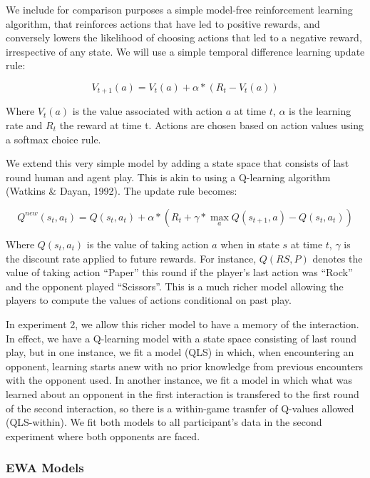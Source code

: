 \documentclass[man,floatsintext]{apa6}
\begin{document}
We include for comparison purposes a simple model-free reinforcement learning algorithm, that reinforces actions that have led to positive rewards, and conversely lowers the likelihood of choosing actions that led to a negative reward, irrespective of any state. We will use a simple temporal difference learning update rule:

\[ V_{t+1}(a) = V_{t}(a) + \alpha*( R_{t}  - V_{t}(a)) \]

Where \(V_{t}(a)\) is the value associated with action \(a\) at time \(t\), \(\alpha\) is the learning rate and \(R_{t}\) the reward at time t. Actions are chosen based on action values using a softmax choice rule.

We extend this very simple model by adding a state space that consists of last round human and agent play. This is akin to using a Q-learning algorithm (Watkins \& Dayan, 1992). The update rule becomes:

\[ Q^{new}(s_{t},a_{t}) = Q(s_{t},a_{t}) + \alpha*( R_{t}  + \gamma*\underset{a}{\max}Q(s_{t+1},a) - Q(s_{t},a_{t}) ) \]

Where \(Q(s_{t},a_{t})\) is the value of taking action \(a\) when in state \(s\) at time \(t\), \(\gamma\) is the discount rate applied to future rewards. For instance, \(Q(RS,P)\) denotes the value of taking action \enquote{Paper} this round if the player's last action was \enquote{Rock} and the opponent played \enquote{Scissors}. This is a much richer model allowing the players to compute the values of actions conditional on past play.

In experiment 2, we allow this richer model to have a memory of the interaction. In effect, we have a Q-learning model with a state space consisting of last round play, but in one instance, we fit a model (QLS) in which, when encountering an opponent, learning starts anew with no prior knowledge from previous encounters with the opponent used. In another instance, we fit a model in which what was learned about an opponent in the first interaction is transfered to the first round of the second interaction, so there is a within-game trasnfer of Q-values allowed (QLS-within). We fit both models to all participant's data in the second experiment where both opponents are faced.

\hypertarget{ewa-models}{%
\subsubsection{EWA Models}\label{ewa-models}}
\end{document}
